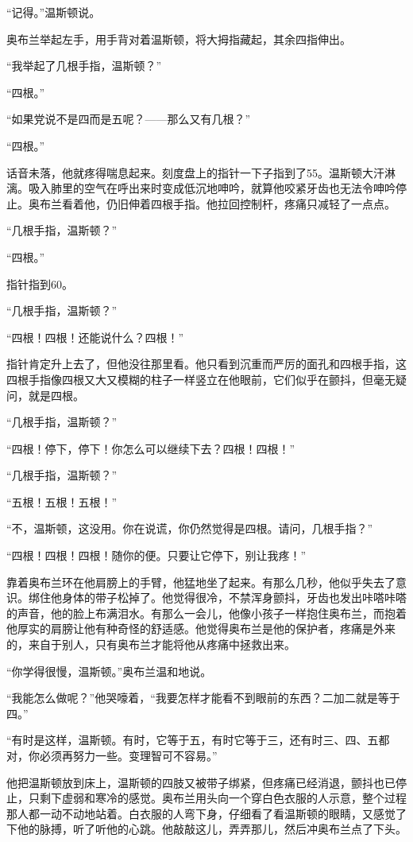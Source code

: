 ``记得。''温斯顿说。

奥布兰举起左手，用手背对着温斯顿，将大拇指藏起，其余四指伸出。

``我举起了几根手指，温斯顿？''

``四根。''

``如果党说不是四而是五呢？——那么又有几根？''

``四根。''

话音未落，他就疼得喘息起来。刻度盘上的指针一下子指到了55。温斯顿大汗淋漓。吸入肺里的空气在呼出来时变成低沉地呻吟，就算他咬紧牙齿也无法令呻吟停止。奥布兰看着他，仍旧伸着四根手指。他拉回控制杆，疼痛只减轻了一点点。

``几根手指，温斯顿？''

``四根。''

指针指到60。

``几根手指，温斯顿？''

``四根！四根！还能说什么？四根！''

指针肯定升上去了，但他没往那里看。他只看到沉重而严厉的面孔和四根手指，这四根手指像四根又大又模糊的柱子一样竖立在他眼前，它们似乎在颤抖，但毫无疑问，就是四根。

``几根手指，温斯顿？''

``四根！停下，停下！你怎么可以继续下去？四根！四根！''

``几根手指，温斯顿？''

``五根！五根！五根！''

``不，温斯顿，这没用。你在说谎，你仍然觉得是四根。请问，几根手指？''

``四根！四根！四根！随你的便。只要让它停下，别让我疼！''

靠着奥布兰环在他肩膀上的手臂，他猛地坐了起来。有那么几秒，他似乎失去了意识。绑住他身体的带子松掉了。他觉得很冷，不禁浑身颤抖，牙齿也发出咔嗒咔嗒的声音，他的脸上布满泪水。有那么一会儿，他像小孩子一样抱住奥布兰，而抱着他厚实的肩膀让他有种奇怪的舒适感。他觉得奥布兰是他的保护者，疼痛是外来的，来自于别人，只有奥布兰才能将他从疼痛中拯救出来。

``你学得很慢，温斯顿。''奥布兰温和地说。

``我能怎么做呢？''他哭嚎着，``我要怎样才能看不到眼前的东西？二加二就是等于四。''

``有时是这样，温斯顿。有时，它等于五，有时它等于三，还有时三、四、五都对，你必须再努力一些。变理智可不容易。''

他把温斯顿放到床上，温斯顿的四肢又被带子绑紧，但疼痛已经消退，颤抖也已停止，只剩下虚弱和寒冷的感觉。奥布兰用头向一个穿白色衣服的人示意，整个过程那人都一动不动地站着。白衣服的人弯下身，仔细看了看温斯顿的眼睛，又感觉了下他的脉搏，听了听他的心跳。他敲敲这儿，弄弄那儿，然后冲奥布兰点了下头。

